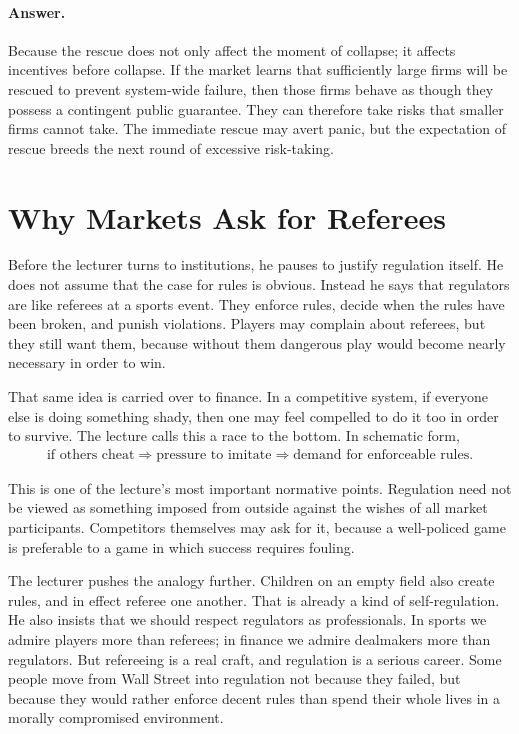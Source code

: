 \paragraph{Answer.} Because the rescue does not only affect the moment of collapse; it affects incentives before collapse. If the market learns that sufficiently large firms will be rescued to prevent system-wide failure, then those firms behave as though they possess a contingent public guarantee. They can therefore take risks that smaller firms cannot take. The immediate rescue may avert panic, but the expectation of rescue breeds the next round of excessive risk-taking.

\section{Why Markets Ask for Referees}

Before the lecturer turns to institutions, he pauses to justify regulation itself. He does not assume that the case for rules is obvious. Instead he says that regulators are like referees at a sports event. They enforce rules, decide when the rules have been broken, and punish violations. Players may complain about referees, but they still want them, because without them dangerous play would become nearly necessary in order to win.

That same idea is carried over to finance. In a competitive system, if everyone else is doing something shady, then one may feel compelled to do it too in order to survive. The lecture calls this a race to the bottom. In schematic form,
\begin{align}
\text{if others cheat}
\Rightarrow
\text{pressure to imitate}
\Rightarrow
\text{demand for enforceable rules}.
\end{align}

This is one of the lecture's most important normative points. Regulation need not be viewed as something imposed from outside against the wishes of all market participants. Competitors themselves may ask for it, because a well-policed game is preferable to a game in which success requires fouling.

The lecturer pushes the analogy further. Children on an empty field also create rules, and in effect referee one another. That is already a kind of self-regulation. He also insists that we should respect regulators as professionals. In sports we admire players more than referees; in finance we admire dealmakers more than regulators. But refereeing is a real craft, and regulation is a serious career. Some people move from Wall Street into regulation not because they failed, but because they would rather enforce decent rules than spend their whole lives in a morally compromised environment.

